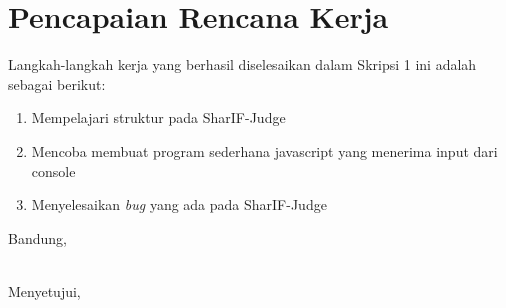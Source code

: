 \documentclass[a4paper,twoside]{article}
\begin{document}
\section{Pencapaian Rencana Kerja}
Langkah-langkah kerja yang berhasil diselesaikan dalam Skripsi 1 ini adalah sebagai berikut:
\begin{enumerate}
\item Mempelajari struktur pada  SharIF-Judge
\item Mencoba membuat program sederhana javascript yang menerima input dari console
\item Menyelesaikan \textit{bug} yang ada pada SharIF-Judge 
\end{enumerate}


\vspace{1cm}
\centering Bandung, \tanggal\\
\vspace{2cm} \nama \\ 
\vspace{1cm}

Menyetujui, \\
\end{document}
